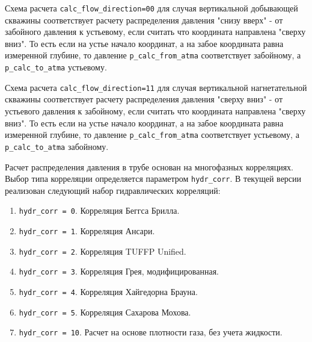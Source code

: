 Схема расчета \texttt{calc_flow_direction=00} для случая вертикальной добывающей скважины соответствует расчету распределения давления "снизу вверх" - от забойного давления к устьевому, если считать что координата направлена "сверху вниз". То есть если на устье начало координат, а на забое координата равна измеренной глубине, то давление \texttt{p_calc_from_atma} соответствует забойному, а \texttt{p_calc_to_atma} устьевому. 


Схема расчета \texttt{calc_flow_direction=11} для случая вертикальной нагнетательной скважины соответствует расчету распределения давления "сверху вниз" - от устьевого давления к забойному, если считать что координата направлена "сверху вниз". То есть если на устье начало координат, а на забое координата равна измеренной глубине, то давление \texttt{p_calc_from_atma} соответствует устьевому, а \texttt{p_calc_to_atma} забойному. 





Расчет распределения давления в трубе основан на многофазных корреляциях. Выбор типа корреляции определяется параметром  \texttt{hydr_corr}. В текущей версии \unf{} реализован следующий набор гидравлических корреляций:
\begin{enumerate}
	\item \texttt{hydr_corr = 0}. Корреляция Беггса Брилла.
	\item \texttt{hydr_corr = 1}. Корреляция Ансари.
	\item \texttt{hydr_corr = 2}. Корреляция TUFFP Unified.
	\item \texttt{hydr_corr = 3}. Корреляция Грея, модифицированная.
	\item \texttt{hydr_corr = 4}. Корреляция Хайгедорна Брауна.
	\item \texttt{hydr_corr = 5}. Корреляция Сахарова Мохова.
	\item \texttt{hydr_corr = 10}. Расчет на основе плотности газа, без учета жидкости.
	
\end{enumerate}

